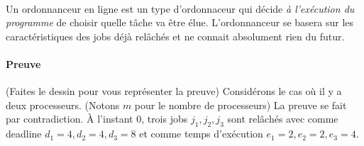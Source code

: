 \paragraph{}
Un ordonnanceur en ligne est un type d'ordonnaceur qui décide \textit{à l'exécution du programme} de choisir quelle tâche va être élue. L'ordonnanceur se basera sur les caractéristiques des jobs déjà relâchés et ne connait absolument rien du futur.

\paragraph{Preuve} (Faites le dessin pour vous représenter la preuve) Considérons le cas où il y a deux processeurs. (Notons $m$ pour le nombre de processeurs) La preuve se fait par contradiction. À l'instant 0, trois jobs $j_{1}, j_{2}, j_{3}$  sont relâchés avec comme deadline $d_{1} = 4, d_{2} = 4, d_{3} = 8$ et comme temps d'exécution $e_{1} = 2, e_{2} = 2, e_{3} = 4$.

